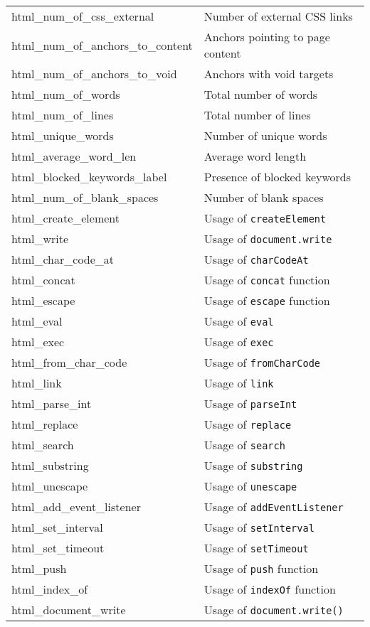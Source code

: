 \begin{longtable}{@{}ll@{}}
html\_num\_of\_css\_external & Number of external CSS links \\
html\_num\_of\_anchors\_to\_content & Anchors pointing to page content \\
html\_num\_of\_anchors\_to\_void & Anchors with void targets \\
html\_num\_of\_words & Total number of words \\
html\_num\_of\_lines & Total number of lines \\
html\_unique\_words & Number of unique words \\
html\_average\_word\_len & Average word length \\
html\_blocked\_keywords\_label & Presence of blocked keywords \\
html\_num\_of\_blank\_spaces & Number of blank spaces \\
html\_create\_element & Usage of \texttt{createElement} \\
html\_write & Usage of \texttt{document.write} \\
html\_char\_code\_at & Usage of \texttt{charCodeAt} \\
html\_concat & Usage of \texttt{concat} function \\
html\_escape & Usage of \texttt{escape} function \\
html\_eval & Usage of \texttt{eval} \\
html\_exec & Usage of \texttt{exec} \\
html\_from\_char\_code & Usage of \texttt{fromCharCode} \\
html\_link & Usage of \texttt{link} \\
html\_parse\_int & Usage of \texttt{parseInt} \\
html\_replace & Usage of \texttt{replace} \\
html\_search & Usage of \texttt{search} \\
html\_substring & Usage of \texttt{substring} \\
html\_unescape & Usage of \texttt{unescape} \\
html\_add\_event\_listener & Usage of \texttt{addEventListener} \\
html\_set\_interval & Usage of \texttt{setInterval} \\
html\_set\_timeout & Usage of \texttt{setTimeout} \\
html\_push & Usage of \texttt{push} function \\
html\_index\_of & Usage of \texttt{indexOf} function \\
html\_document\_write & Usage of \texttt{document.write()} \\

\end{longtable}
